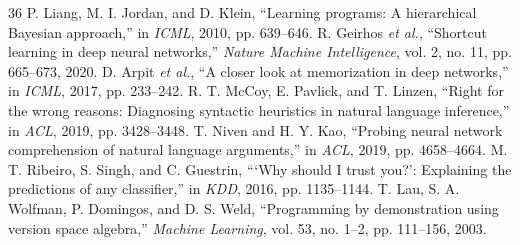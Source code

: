 \documentclass[10pt,twocolumn]{article}
\begin{document}
\begin{thebibliography}{36}
 P. Liang, M. I. Jordan, and D. Klein, ``Learning programs: A hierarchical Bayesian approach,'' in \emph{ICML}, 2010, pp. 639--646.
 R. Geirhos \emph{et al.}, ``Shortcut learning in deep neural networks,'' \emph{Nature Machine Intelligence}, vol. 2, no. 11, pp. 665--673, 2020.
 D. Arpit \emph{et al.}, ``A closer look at memorization in deep networks,'' in \emph{ICML}, 2017, pp. 233--242.
 R. T. McCoy, E. Pavlick, and T. Linzen, ``Right for the wrong reasons: Diagnosing syntactic heuristics in natural language inference,'' in \emph{ACL}, 2019, pp. 3428--3448.
 T. Niven and H. Y. Kao, ``Probing neural network comprehension of natural language arguments,'' in \emph{ACL}, 2019, pp. 4658--4664.
 M. T. Ribeiro, S. Singh, and C. Guestrin, ```Why should I trust you?': Explaining the predictions of any classifier,'' in \emph{KDD}, 2016, pp. 1135--1144.
 T. Lau, S. A. Wolfman, P. Domingos, and D. S. Weld, ``Programming by demonstration using version space algebra,'' \emph{Machine Learning}, vol. 53, no. 1--2, pp. 111--156, 2003.
\end{thebibliography}
\endgroup
\end{document}
